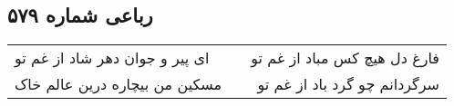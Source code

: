 \begin{center}
\section*{رباعی شماره ۵۷۹}
\label{sec:sh579}
\begin{longtable}{l p{0.5cm} r}
ای پیر و جوان دهر شاد از غم تو
&&
فارغ دل هیچ کس مباد از غم تو
\\
مسکین من بیچاره درین عالم خاک
&&
سرگردانم چو گرد باد از غم تو
\\
\end{longtable}
\end{center}

